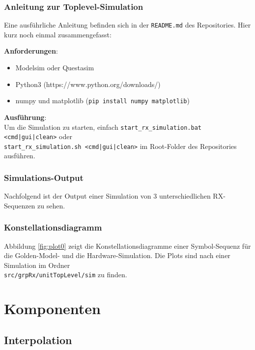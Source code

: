 \subsubsection{Anleitung zur Toplevel-Simulation}
Eine ausführliche Anleitung befinden sich in der \texttt{README.md} des Repositories. Hier kurz noch einmal zusammengefasst:

\vspace{5pt}
\noindent
\textbf{Anforderungen}:
\begin{itemize}
\item Modelsim oder Questasim
\item Python3 (https://www.python.org/downloads/)
\item numpy und matplotlib (\texttt{pip install numpy matplotlib})
\end{itemize}

\vspace{5pt}
\noindent
\textbf{Ausführung}:\\
Um die Simulation zu starten, einfach \texttt{start\_rx\_simulation.bat <cmd|gui|clean>} oder\\ \texttt{start\_rx\_simulation.sh <cmd|gui|clean>} im Root-Folder des Repositories ausführen.

\subsubsection{Simulations-Output}
Nachfolgend ist der Output einer Simulation von 3 unterschiedlichen RX-Sequenzen zu sehen.

\subsubsection{Konstellationsdiagramm}
Abbildung \ref{fig:plot0} zeigt die Konstellationsdiagramme einer Symbol-Sequenz für die Golden-Model- und die Hardware-Simulation. Die Plots sind nach einer Simulation im Ordner\\ \texttt{src/grpRx/unitTopLevel/sim} zu finden.

\section{Komponenten}

\subsection{Interpolation}


